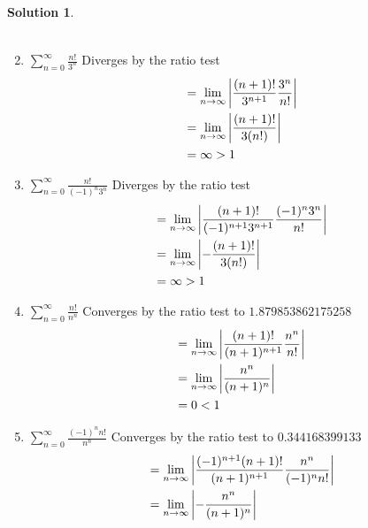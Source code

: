 \documentclass[10pt]{article}
\theoremstyle{definition}
\newtheorem{soln}{Solution}
\begin{document}
\begin{soln}
\begin{enumerate}[label=(\alph*)]
\begin{align*}
                \end{align*}
          \item $\displaystyle \sum_{n = 0}^{\infty} \frac{n!}{3^n}$ Diverges by the ratio test
                \begin{align*}
                      & = \lim_{n \to \infty} \abs{\frac{(n+1)!}{3^{n+1}}\frac{3^n}{n!}} \\
                      & = \lim_{n \to \infty} \abs{\frac{(n+1)!}{3(n!)}}                 \\
                      & = \infty > 1                                                     \\
                \end{align*}
          \item $\displaystyle \sum_{n = 0}^{\infty} \frac{n!}{(-1)^n3^n}$ Diverges by the ratio test
                \begin{align*}
                      & = \lim_{n \to \infty} \abs{\frac{(n+1)!}{(-1)^{n+1}3^{n+1}}\frac{(-1)^n3^n}{n!}} \\
                      & = \lim_{n \to \infty} \abs{-\frac{(n+1)!}{3(n!)}}                                \\
                      & = \infty > 1                                                                     \\
                \end{align*}
          \item $\displaystyle \sum_{n = 0}^{\infty} \frac{n!}{n^n}$ Converges by the ratio test to $1.879853862175258$
                \begin{align*}
                      & = \lim_{n \to \infty} \abs{\frac{(n+1)!}{(n+1)^{n+1}}\frac{n^n}{n!}} \\
                      & = \lim_{n \to \infty} \abs{\frac{n^n}{(n+1)^n}}                      \\
                      & = 0 < 1                                                              \\
                \end{align*}
          \item $\displaystyle \sum_{n = 0}^{\infty} \frac{(-1)^nn!}{n^n}$ Converges by the ratio test to $0.344168399133$
                \begin{align*}
                      & = \lim_{n \to \infty} \abs{\frac{(-1)^{n+1}(n+1)!}{(n+1)^{n+1}}\frac{n^n}{(-1)^nn!}} \\
                      & = \lim_{n \to \infty} \abs{-\frac{n^n}{(n+1)^n}}                                     \\

\end{align*}
\end{enumerate}
\end{soln}
\end{document}
